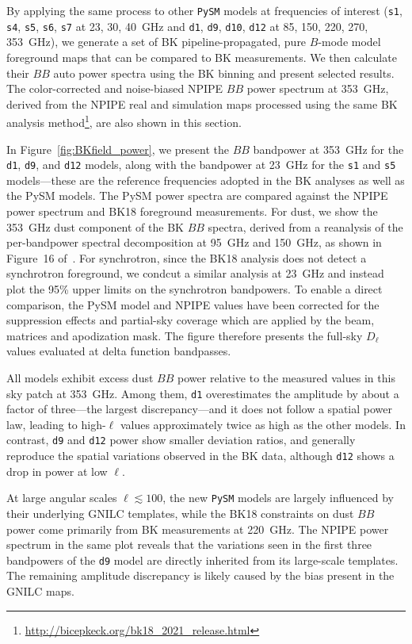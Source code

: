 \documentclass[twocolumn]{aastex631}
\begin{document}
By applying the same process to other \texttt{PySM} models at frequencies of interest (\texttt{s1}, \texttt{s4}, \texttt{s5}, \texttt{s6}, \texttt{s7} at 23, 30, 40~GHz and \texttt{d1}, \texttt{d9}, \texttt{d10}, \texttt{d12} at 85, 150, 220, 270, 353~GHz), we generate a set of BK pipeline-propagated, pure $B$-mode model foreground maps that can be compared to BK measurements. We then calculate their $BB$ auto power spectra using the BK binning and present selected results. The color-corrected and noise-biased NPIPE $BB$ power spectrum at 353~GHz, derived from the NPIPE real and simulation maps processed using the same BK analysis method\footnote{\url{http://bicepkeck.org/bk18_2021_release.html}}, are also shown in this section. 

In Figure~\ref{fig:BKfield_power}, we present the $BB$ bandpower at 353~GHz for the \texttt{d1}, \texttt{d9}, and \texttt{d12} models, along with the bandpower at 23~GHz for the \texttt{s1} and \texttt{s5} models---these are the reference frequencies adopted in the BK analyses as well as the PySM models. The PySM power spectra are compared against the NPIPE power spectrum and BK18 foreground measurements. For dust, we show the 353~GHz dust component of the BK $BB$ spectra, derived from a reanalysis of the per-bandpower spectral decomposition at 95~GHz and 150~GHz, as shown in Figure~16 of~\cite{Ade:2021}. For synchrotron, since the BK18 analysis does not detect a synchrotron foreground, we condcut a similar analysis at 23~GHz and instead plot the 95\% upper limits on the synchrotron bandpowers. To enable a direct comparison, the PySM model and NPIPE values have been corrected for the suppression effects and partial-sky coverage which are applied by the beam, matrices and apodization mask. The figure therefore presents the full-sky $D_\ell$ values evaluated at delta function bandpasses.

All models exhibit excess dust $BB$ power relative to the measured values in this sky patch at 353~GHz. Among them, \texttt{d1} overestimates the amplitude by about a factor of three---the largest discrepancy---and it does not follow a spatial power law, leading to high-$\ell$ values approximately twice as high as the other models. In contrast, \texttt{d9} and \texttt{d12} power show smaller deviation ratios, and generally reproduce the spatial variations observed in the BK data, although \texttt{d12} shows a drop in power at low $\ell$.

At large angular scales $\ell \lesssim 100$, the new \texttt{PySM} models are largely influenced by their underlying GNILC templates, while the BK18 constraints on dust $BB$ power come primarily from BK measurements at 220~GHz. The NPIPE power spectrum in the same plot reveals that the variations seen in the first three bandpowers of the \texttt{d9} model are directly inherited from its large-scale templates. The remaining amplitude discrepancy is likely caused by the bias present in the GNILC maps.
\end{document}
